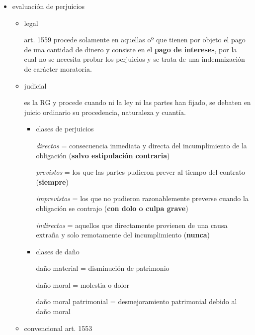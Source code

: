 \documentclass[]{article}
\providecommand{\tightlist}{%
  \setlength{\itemsep}{0pt}\setlength{\parskip}{0pt}}
\begin{document}
\begin{itemize}
\begin{itemize}
\begin{itemize}
\begin{itemize}
        \begin{itemize}
        \tightlist
        \item
          evaluación de perjuicios

          \begin{itemize}
          \item
            legal

            art. 1559 procede solamente en aquellas oº que tienen por
            objeto el pago de una cantidad de dinero y consiste en el
            \textbf{pago de intereses}, por la cual no se necesita
            probar los perjuicios y se trata de una indemnización de
            carácter moratoria.
          \item
            judicial

            es la RG y procede cuando ni la ley ni las partes han
            fijado, se debaten en juicio ordinario su procedencia,
            naturaleza y cuantía.

            \begin{itemize}
            \item
              clases de perjuicios

              \emph{directos} = consecuencia inmediata y directa del
              incumplimiento de la obligación (\textbf{salvo
              estipulación contraria})

              \emph{previstos} = los que las partes pudieron prever al
              tiempo del contrato (\textbf{siempre})

              \emph{imprevistos} = los que no pudieron razonablemente
              preverse cuando la obligación se contrajo (\textbf{con
              dolo o culpa grave})

              \emph{indirectos} = aquellos que directamente provienen de
              una causa extraña y solo remotamente del incumplimiento
              (\textbf{nunca})
            \item
              clases de daño

              daño material = disminución de patrimonio

              daño moral = molestia o dolor

              daño moral patrimonial = desmejoramiento patrimonial
              debido al daño moral
            \end{itemize}
          \item
            convencional art. 1553


\end{itemize}
\end{itemize}
\end{itemize}
\end{itemize}
\end{itemize}
\end{itemize}
\end{document}
